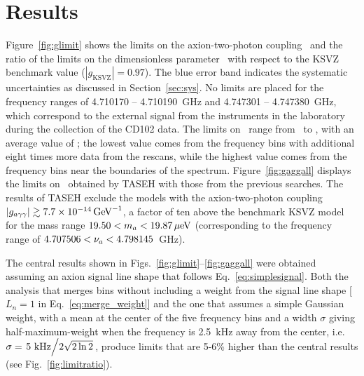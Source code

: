 \section{Results} \label{sec:results}

Figure~\ref{fig:glimit} shows the limits on the axion-two-photon coupling 
\gagg\ and the ratio of the limits on the dimensionless parameter \ggamma\ 
with respect to the KSVZ benchmark value ($\left|g_\text{KSVZ}\right|=0.97$).  
The blue error band indicates the systematic uncertainties as discussed in 
Section~\ref{sec:sys}. No limits are placed for the frequency ranges of 
4.710170 -- 4.710190~GHz and 4.747301 -- 4.747380~GHz, 
which correspond to the external signal from the instruments in the 
laboratory during the collection of the CD102 data. 
The limits on \gagg\ range from \lolimit\ to \hilimit, with an average 
value of \avelimit; the lowest value comes from the frequency bins with 
additional eight times more data from the rescans, while the highest value 
comes from the frequency bins near the boundaries of the spectrum. 
Figure~\ref{fig:gaggall} displays 
the limits on \gagg\ obtained by TASEH with those from the previous searches. 
The results of TASEH exclude the models with the axion-two-photon
coupling $\left|g_{a\gamma\gamma}\right|\gtrsim 7.7\times 10^{-14}\,\text{Ge\hspace{-.08em}V}^{-1}$, a factor of ten above the benchmark
KSVZ model for the mass range $19.50 < m_a < 19.87 \,\mu\text{e\hspace{-.08em}V}$ (corresponding to 
the frequency range of $4.707506 < \nu_a < 4.798145$~GHz). 


The central results shown in Figs.~\ref{fig:glimit}--\ref{fig:gaggall} were 
obtained assuming an axion signal line shape that follows 
Eq.~\eqref{eq:simplesignal}. Both the analysis that merges bins without 
including a weight from the signal line shape [$L_n=1$ in 
Eq.~\eqref{eq:merge_weight}] and the one 
that assumes a simple Gaussian weight, with a mean at the center of the five 
frequency bins and a width $\sigma$ 
giving half-maximum-weight when the frequency 
is 2.5~kHz away from the center, i.e. 
$\sigma=\left.5~\text{kHz}\middle/2\sqrt{2\ln2}\right.$, produce limits that 
are 5-6\% higher than the central results (see Fig.~\ref{fig:limitratio}). 

